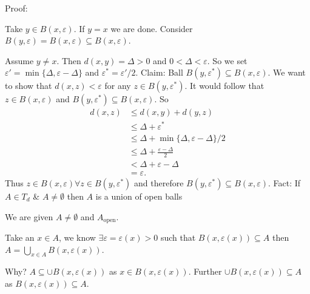 \documentclass[10pt]{article}
\begin{document}
Proof:
\begin{multicols}{2}
\begin{center}
\end{center}

Take $y\in B(x,\varepsilon)$. If $y=x$ we are done. Consider $B(y,\varepsilon)=B(x,\varepsilon)\subseteq B(x,\varepsilon)$.

Assume $y\neq x$. Then $d(x,y)=\Delta>0$ and $0<\Delta<\varepsilon$. So we set $\varepsilon'=\min\{\Delta,\varepsilon-\Delta\}$ and $\varepsilon^{*}=\varepsilon'/2$. Claim: Ball $B(y,\varepsilon^{*})\subseteq B(x,\varepsilon)$. We want to show that $d(x,z)<\varepsilon$ for any $z\in B(y,\varepsilon^{*})$. It would follow that $z\in B(x,\varepsilon)$ and $B(y,\varepsilon^{*})\subseteq B(x,\varepsilon)$. So
\begin{align*}
    d(x,z)&\leq d(x,y)+d(y,z)\\
    &\leq\Delta+\varepsilon^{*}\\
    &\leq\Delta+\min\{\Delta,\varepsilon-\Delta\}/2\\
    &\leq\Delta+\frac{\varepsilon-\Delta}{2}\\
    &\boxed{<}\Delta+\varepsilon-\Delta\\
    &=\varepsilon.
\end{align*}
Thus $z\in B(x,\varepsilon)\forall z\in B(y,\varepsilon^{*})$ and therefore $B(y,\varepsilon^{*})\subseteq B(x,\varepsilon)$.
Fact: If $A\in T_{d}$ \& $A\neq\emptyset$ then $A$ is a union of open balls
\end{multicols}
We are given $A\neq\emptyset$ and $A_{\text{open}}$. 

Take an $x\in A$, we know $\exists\varepsilon=\varepsilon(x)>0$ such that $B(x,\varepsilon(x))\subseteq A$ then $A=\bigcup_{x\in A}B(x,\varepsilon(x))$. 

Why? $A\subseteq\cup B(x,\varepsilon(x))$ as $x\in B(x,\varepsilon(x))$. Further $\cup B(x,\varepsilon(x))\subseteq A$ as $B(x,\varepsilon(x))\subseteq A$. 
\begin{quote}
\end{quote}
\end{document}
